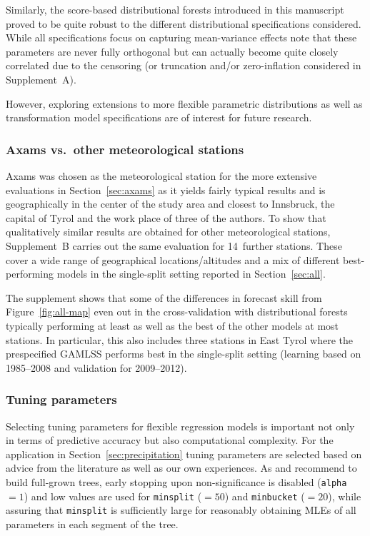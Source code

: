 \documentclass[aoas, preprint]{imsart}
\numberwithin{equation}{subsection}
\begin{document}
Similarly, the score-based distributional forests introduced in this manuscript
proved to be quite robust to the different distributional specifications considered.
While all specifications focus on capturing mean-variance effects note that these
parameters are never fully orthogonal but can actually become quite closely correlated
due to the censoring (or truncation and/or zero-inflation considered in Supplement~A).

However, exploring extensions to more flexible parametric distributions
\citep[e.g., such as the Dagum distribution considered by][in GAMLSS-type models]{Klein+Kneib+Lang:2015}
as well as transformation model specifications \citep[e.g., as in][]{Hothorn+Zeileis:2017}
are of interest for future research.


\subsubsection*{Axams vs.~other meteorological stations}

Axams was chosen as the meteorological station for the more extensive evaluations
in Section~\ref{sec:axams} as it yields fairly typical results
and is geographically in the center of the study area and closest to
Innsbruck, the capital of Tyrol and the work place of three of the authors.
To show that qualitatively similar results are obtained for other
meteorological stations, Supplement~B \citep{Schlosser+Hothorn+Stauffer:2019b}
carries out the same evaluation for 14~further stations. These
cover a wide range of geographical locations/altitudes and a mix of
different best-performing models in the single-split setting reported in
Section~\ref{sec:all}.

The supplement shows that some of the differences in forecast skill from
Figure~\ref{fig:all-map} even out in the cross-validation with distributional
forests typically performing at least as well as the best of the other models at most
stations. In particular, this also includes three stations in East Tyrol
where the prespecified GAMLSS performs best in the single-split setting
(learning based on 1985--2008 and validation for 2009--2012). 


\subsubsection*{Tuning parameters}

Selecting tuning parameters for flexible regression models is important
not only in terms of predictive accuracy but also computational complexity. 
For the application in Section~\ref{sec:precipitation} tuning parameters
are selected based on advice from the literature as well as our own experiences.
As \cite{Hastie+Tibshirani+Friedman:2001} and \cite{Breiman:2001} recommend to 
build full-grown trees, early stopping upon non-significance is disabled
(\texttt{alpha} $= 1$) and low values are used for \texttt{minsplit} ($ = 50$)
and \texttt{minbucket} ($ = 20$), while assuring that \texttt{minsplit}
is sufficiently large for reasonably obtaining MLEs of all parameters in each
segment of the tree.
\end{document}
